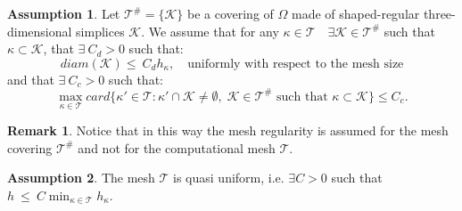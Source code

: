 \documentclass[12pt, a4paper]{article}
\theoremstyle{definition}
\newtheorem{ipotesi}{Assumption}
\theoremstyle{plain}
\theoremstyle{plain}
\theoremstyle{definition}
\newtheorem*{remark}{Remark}
\begin{document}
\begin{ipotesi} \label{ipo:ipo4}
	Let $\mathcal{T}^\# = \{ \mathcal{K} \}$ be a covering of $\Omega$ made of 
	shaped-regular three-dimensional simplices $\mathcal{K}$. We assume that 
	for any $\kappa\in\mathcal{T} \quad \exists\mathcal{K}\in\mathcal{T}^\# $ 
	such that $\kappa\subset\mathcal{K}$, that $\exists~C_d>0$ such that:
	\begin{equation*}
		diam(\mathcal{K})\leq~C_dh_\kappa, \quad \text{uniformly with respect to the mesh size}
	\end{equation*}
	and that $\exists~C_c>0$ such that:
	\begin{equation*}
		\max\limits_{\kappa \in \mathcal{T}} card \big\{ \kappa' \in \mathcal{T} : \kappa' \cap \mathcal{K} \ne \emptyset, \; \mathcal{K} \in \mathcal{T}^\# \text{ such that } \kappa \subset \mathcal{K} \big\} \leq C_c.
	\end{equation*}
\end{ipotesi}
\begin{remark}
	Notice that in this way the mesh regularity is assumed for the mesh 
	covering $\mathcal{T}^\#$ and not for the computational mesh $\mathcal{T}$.
\end{remark}
\begin{ipotesi} \label{ipo:ipo5}
	The mesh $\mathcal{T}$ is quasi uniform, i.e. $\exists C>0$ such that $h~\leq~C \min_{\kappa \in \mathcal{T}} h_\kappa$.
\end{ipotesi}
\end{document}
